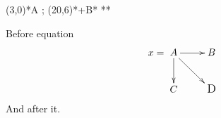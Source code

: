 \documentclass{article}
\begin{document}
\xy (3,0)*{A} ; (20,6)*+{B}*\cir{} **\dir{-} \endxy


Before equation
\[ x = \xymatrix{A \ar[r] \ar[d] \ar[rd] & B \\ C & \hbox{\large D}} \]
And after it.
\end{document}
